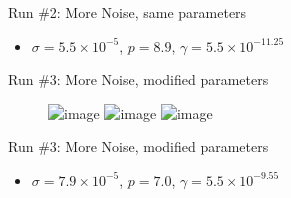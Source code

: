 \documentclass[xcolor=dvipsnames]{beamer}
\begin{document}
\begin{frame}{Run \#2: More Noise, same parameters}
\begin{itemize}
    \item $\sigma = 5.5\times 10^{-5}$, $p=8.9$, $\gamma = 5.5\times 10^{-11.25}$
\end{itemize}
\end{frame}
\begin{frame}{Run \#3: More Noise, modified parameters}
    \begin{figure}[h!]
  \centering
  \begin{overprint}
  \includegraphics<1>[width=\linewidth]{ex3original.png}
  \includegraphics<2>[width=\linewidth]{ex3blurred.png}
  \includegraphics<3>[width=\linewidth]{ex3spd.png}
    \end{overprint}
\end{figure}
\end{frame}
\begin{frame}{Run \#3: More Noise, modified parameters}
\begin{itemize}
    \item $\sigma = 7.9\times 10^{-5}$, $p=7.0$, $\gamma = 5.5\times 10^{-9.55}$
\end{itemize}
\end{frame}
\end{document}
